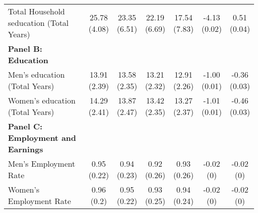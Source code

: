\begin{table}[H]
{\begin{threeparttable}
\begin{tabular}[t]{lcccccc}
\hspace{1em}Total Household seducation (Total Years) & \specialcell{25.78\\(4.08)} & \specialcell{23.35\\(6.51)} & \specialcell{22.19\\(6.69)} & \specialcell{17.54\\(7.83)} & \specialcell{-4.13\\(0.02)} & \specialcell{0.51\\(0.04)}\\
\textbf{Panel B: Education} & \textbf{} & \textbf{} & \textbf{} & \textbf{} & \textbf{} & \textbf{}\\
\addlinespace
\hspace{1em}Men’s education (Total Years) & \specialcell{13.91\\(2.39)} & \specialcell{13.58\\(2.35)} & \specialcell{13.21\\(2.32)} & \specialcell{12.91\\(2.26)} & \specialcell{-1.00\\(0.01)} & \specialcell{-0.36\\(0.03)}\\
\hspace{1em}Women’s education (Total Years) & \specialcell{14.29\\(2.41)} & \specialcell{13.87\\(2.47)} & \specialcell{13.42\\(2.35)} & \specialcell{13.27\\(2.37)} & \specialcell{-1.01\\(0.01)} & \specialcell{-0.46\\(0.03)}\\
\textbf{Panel C: Employment and Earnings} & \textbf{} & \textbf{} & \textbf{} & \textbf{} & \textbf{} & \textbf{}\\
\hspace{1em}Men’s Employment Rate & \specialcell{0.95\\(0.22)} & \specialcell{0.94\\(0.23)} & \specialcell{0.92\\(0.26)} & \specialcell{0.93\\(0.26)} & \specialcell{-0.02\\(0)} & \specialcell{-0.02\\(0)}\\
\hspace{1em}Women’s Employment Rate & \specialcell{0.96\\(0.2)} & \specialcell{0.95\\(0.22)} & \specialcell{0.93\\(0.25)} & \specialcell{0.94\\(0.24)} & \specialcell{-0.02\\(0)} & \specialcell{-0.02\\(0)}\\

\end{tabular}
\end{threeparttable}}
\end{table}
